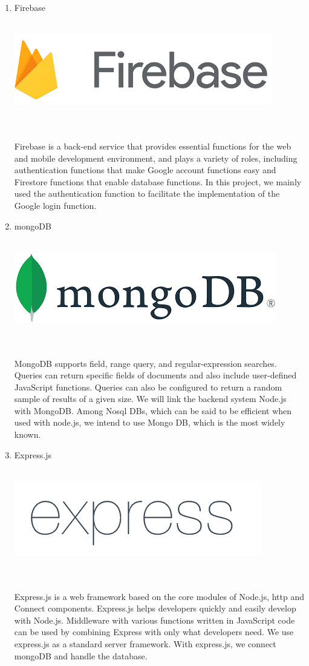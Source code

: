 \documentclass[conference]{IEEEtran}
\begin{document}
\begin{enumerate}
	\item{Firebase}\\
	\\
	\centerline{\includegraphics[scale=0.4]{pics/Firebase.png}}\\\\
Firebase is a back-end service that provides essential functions for the web and mobile development environment, and plays a variety of roles, including authentication functions that make Google account functions easy and Firestore functions that enable database functions. In this project, we mainly used the authentication function to facilitate the implementation of the Google login function.\\
	\item{mongoDB}\\
	\\
	\centerline{\includegraphics[scale=0.4]{pics/mongo.png}}\\\\
MongoDB supports field, range query, and regular-expression searches. Queries can return specific fields of documents and also include user-defined JavaScript functions. Queries can also be configured to return a random sample of results of a given size. We will link the backend system Node.js with MongoDB. Among Nosql DBs, which can be said to be efficient when used with node.js, we intend to use Mongo DB, which is the most widely known.\\
	\item{Express.js}\\
	\\
	\centerline{\includegraphics[scale=0.4]{pics/express.png}}\\\\
Express.js is a web framework based on the core modules of Node.js, http and Connect components. Express.js helps developers quickly and easily develop with Node.js. Middleware with various functions written in JavaScript code can be used by combining Express with only what developers need. We use express.js as a standard server framework. With express.js, we connect mongoDB and handle the database.
\end{enumerate}
\end{document}
